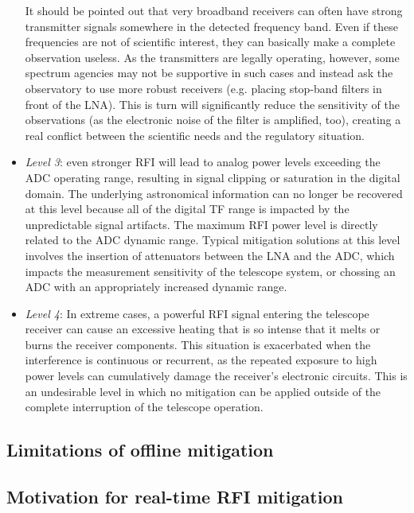 \begin{itemize}
It should be pointed out that very broadband receivers can often have strong transmitter signals somewhere in the detected frequency band. Even if these frequencies are not of scientific interest, they can basically make a complete observation useless. As the transmitters are legally operating, however, some spectrum agencies may not be supportive in such cases and instead ask the observatory to use more robust receivers (e.g. placing stop-band filters in front of the LNA). This is turn will significantly reduce the sensitivity of the observations (as the electronic noise of the filter is amplified, too), creating a real conflict between the scientific needs and the regulatory situation. 

\item \emph{Level 3}: even stronger RFI will lead to analog power levels exceeding the ADC operating range, resulting in signal clipping or saturation in the digital domain. The underlying astronomical information can no longer be recovered at this level because all of the digital TF range is impacted by the unpredictable signal artifacts. The maximum RFI power level is directly related to the ADC dynamic range. Typical mitigation solutions at this level involves the insertion of attenuators between the LNA and the ADC, which impacts the measurement sensitivity of the telescope system, or chossing an ADC with an appropriately increased dynamic range.
\item \emph{Level 4}: In extreme cases, a powerful RFI signal entering the telescope receiver can cause an excessive heating that is so intense that it melts or burns the receiver components. This situation is exacerbated when the interference is continuous or recurrent, as the repeated exposure to high power levels can cumulatively damage the receiver's electronic circuits. This is an undesirable level in which no mitigation can be applied outside of the complete interruption of the telescope operation.
\end{itemize}

\subsection{Limitations of offline mitigation}
\label{subsection:hardware:introduction:limitations_offline}

\subsection{Motivation for real-time RFI mitigation}
\label{subsection:hardware:introduction:motivations}
